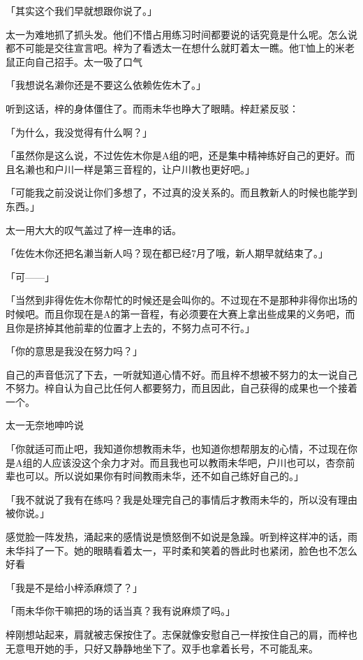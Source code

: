 \documentclass[UTF8]{ctexart}
\begin{document}
    「其实这个我们早就想跟你说了。」

    太一为难地抓了抓头发。他们不惜占用练习时间都要说的话究竟是什么呢。怎么说都不可能是交往宣言吧。梓为了看透太一在想什么就盯着太一瞧。他T恤上的米老鼠正向自己招手。太一吸了口气

    「我想说名濑你还是不要这么依赖佐佐木了。」

    听到这话，梓的身体僵住了。而雨未华也睁大了眼睛。梓赶紧反驳：

    「为什么，我没觉得有什么啊？」

    「虽然你是这么说，不过佐佐木你是A组的吧，还是集中精神练好自己的更好。而且名濑也和户川一样是第三音程的，让户川教也更好吧。」

    「可能我之前没说让你们多想了，不过真的没关系的。而且教新人的时候也能学到东西。」

    太一用大大的叹气盖过了梓一连串的话。

    「佐佐木你还把名濑当新人吗？现在都已经7月了哦，新人期早就结束了。」

    「可——」

    「当然到非得佐佐木你帮忙的时候还是会叫你的。不过现在不是那种非得你出场的时候吧。而且你现在是A的第一音程，有必须要在大赛上拿出些成果的义务吧，而且你是挤掉其他前辈的位置才上去的，不努力点可不行。」

    「你的意思是我没在努力吗？」

    自己的声音低沉了下去，一听就知道心情不好。而且梓不想被不努力的太一说自己不努力。梓自认为自己比任何人都要努力，而且因此，自己获得的成果也一个接着一个。

    太一无奈地呻吟说

    「你就适可而止吧，我知道你想教雨未华，也知道你想帮朋友的心情，不过现在你是A组的人应该没这个余力才对。而且我也可以教雨未华吧，户川也可以，杏奈前辈也可以。所以说如果你有时间教雨未华，还不如自己练好自己的。」

    「我不就说了我有在练吗？我是处理完自己的事情后才教雨未华的，所以没有理由被你说。」

    感觉脸一阵发热，涌起来的感情说是愤怒倒不如说是急躁。听到梓这样冲的话，雨未华抖了一下。她的眼睛看着太一，平时柔和笑着的唇此时也紧闭，脸色也不怎么好看

    「我是不是给小梓添麻烦了？」

    「雨未华你干嘛把的场的话当真？我有说麻烦了吗。」

    梓刚想站起来，肩就被志保按住了。志保就像安慰自己一样按住自己的肩，而梓也无意甩开她的手，只好又静静地坐下了。双手也拿着长号，不可能乱来。
\end{document}

